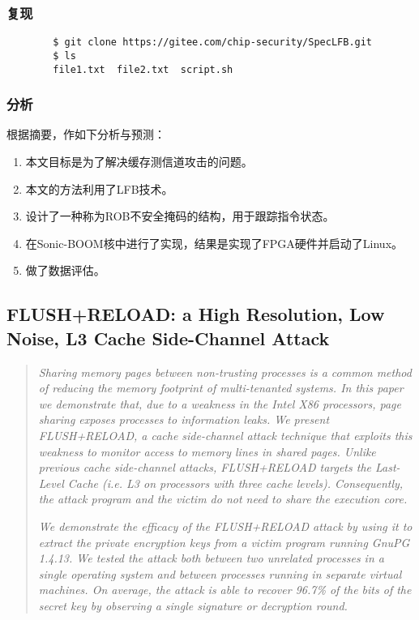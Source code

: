 \documentclass[10pt]{article}
\begin{document}
    \subsubsection{复现}
    \begin{verbatim}
        $ git clone https://gitee.com/chip-security/SpecLFB.git
        $ ls
        file1.txt  file2.txt  script.sh
        \end{verbatim}
    \subsubsection{分析}
    
    根据摘要，作如下分析与预测：
    \begin{enumerate}
        \item 本文目标是为了解决缓存测信道攻击的问题。
        \item 本文的方法利用了LFB技术。 
        \item 设计了一种称为ROB不安全掩码的结构，用于跟踪指令状态。
        \item 在Sonic-BOOM核中进行了实现，结果是实现了FPGA硬件并启动了Linux。
        \item 做了数据评估。
    \end{enumerate}

    \newpage
    
    \subsection{FLUSH+RELOAD: a High Resolution, Low Noise, L3 Cache Side-Channel Attack\cite{184415}}\label{sec14-paper-yarom}
    

    \begin{quotation}
        \textit{Sharing memory pages between non-trusting processes
        is a common method of reducing the memory footprint
        of multi-tenanted systems. In this paper we demonstrate
        that, due to a weakness in the Intel X86 processors,
        page sharing exposes processes to information leaks. We
        present FLUSH+RELOAD, a cache side-channel attack
        technique that exploits this weakness to monitor access
        to memory lines in shared pages. Unlike previous cache
        side-channel attacks, FLUSH+RELOAD targets the Last-
        Level Cache (i.e. L3 on processors with three cache levels).
        Consequently, the attack program and the victim do
        not need to share the execution core.}

        \textit{We demonstrate the efficacy of the FLUSH+RELOAD
        attack by using it to extract the private encryption keys
        from a victim program running GnuPG 1.4.13. We tested
        the attack both between two unrelated processes in a single
        operating system and between processes running in
        separate virtual machines. On average, the attack is able
        to recover 96.7\% of the bits of the secret key by observing
        a single signature or decryption round.}
    \end{quotation}
\end{document}
